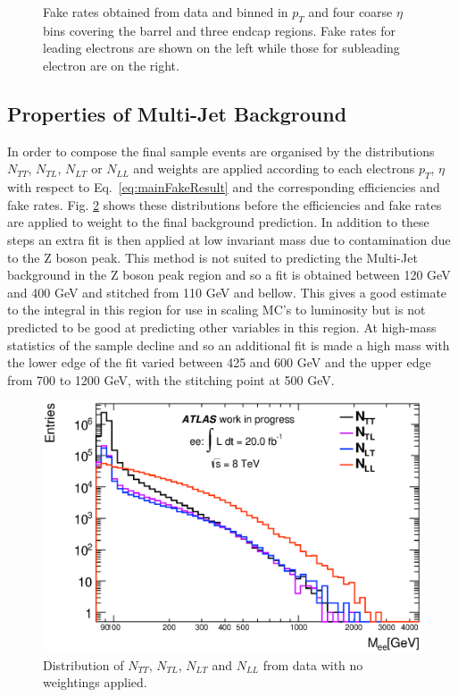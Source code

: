 \begin{figure}[h]
\begin{center}
      \end{center}
   \caption{Fake rates obtained from data and binned in $p_{T}$ and four coarse $\eta$ bins covering the barrel and three endcap regions. Fake rates for leading electrons are shown on the left while those for subleading electron are on the right.}
   \label{fig:fakeRates}
   \end{figure}




\subsection{Properties of Multi-Jet Background}

In order to compose the final sample events are organised by the distributions $N_{TT}$, $N_{TL}$, $N_{LT}$ or $N_{LL}$ and weights are applied according to each electrons $p_{T}$, $\eta$ with respect to Eq.~\ref{eq:mainFakeResult} and the corresponding efficiencies and fake rates. 
Fig. \ref{fig:N_dist} shows these distributions before the efficiencies and fake rates are applied to weight to the final background prediction. In addition to these steps an extra fit is then applied at low invariant mass due to contamination due to the Z boson peak. This method is not suited to predicting the Multi-Jet background in the Z boson peak region and so a fit is obtained between 120 GeV and 400 GeV and stitched from 110 GeV and bellow. This gives a good estimate to the integral in this region for use in scaling MC's to luminosity but is not predicted to be good at predicting other variables in this region. At high-mass statistics of the sample decline and so an additional fit is made a high mass with the lower edge of the fit varied between 425 and 600 GeV and the upper edge from 700 to 1200 GeV, with the stitching point at 500 GeV.

   \begin{figure}[h]
      \begin{center}
      \includegraphics[scale=0.8]{images/N_distributions.eps}
      \end{center}
   \caption{Distribution of $N_{TT}$, $N_{TL}$, $N_{LT}$ and $N_{LL}$ from data with no weightings applied.}
   \label{fig:N_dist}
   \end{figure}






